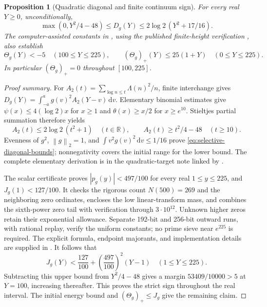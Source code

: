 \documentclass[11pt]{article}
\numberwithin{equation}{section}
\newtheorem{proposition}[theorem]{Proposition}
\theoremstyle{definition}
\theoremstyle{remark}
\newcommand{\norm}[1]{\left\lVert #1\right\rVert}
\newcommand{\dd}{\,\mathrm d}
\begin{document}
\begin{proposition}[Quadratic diagonal and finite continuum sign]
\label{prop:selective-finite-sign}
For every real \(Y\ge0\), unconditionally,
\begin{equation}\label{eq:selective-diagonal-bounds}
\max(0,Y^2/4-48)\le D_g(Y)
\le2\log2\,(Y^2+17/16).
\end{equation}
The computer-assisted constants in \cite{SelectiveLossCertificate},
using the published finite-height verification \cite{PlattTrudgian},
also establish
\begin{equation}\label{eq:selective-finite-sign}
\Theta_g(Y)<-5\quad(100\le Y\le225),\qquad
(\Theta_g)_+(Y)\le25(1+Y)\quad(0\le Y\le225).
\end{equation}
In particular \((\Theta_g)_+=0\) throughout \([100,225]\).
\end{proposition}
\begin{proof}[Proof summary]
For \(A_2(t)=\sum_{\log n\le t}\Lambda(n)^2/n\), finite
interchange gives \(D_g(Y)=\int_{-a}^ag(v)^2A_2(Y-v)\dd v\).
Elementary binomial estimates give \(\psi(x)\le4(\log2)x\)
for \(x\ge1\) and \(\theta(x)\ge x/2\) for \(x\ge e^{10}\).
Stieltjes partial summation therefore yields
\[
A_2(t)\le2\log2\,(t^2+1)\quad(t\in\mathbb R),\qquad
A_2(t)\ge t^2/4-48\quad(t\ge10).
\]
Evenness of \(g^2\), \(\norm g_2=1\), and
\(\int v^2g(v)^2\dd v\le1/16\) prove
\eqref{eq:selective-diagonal-bounds}; nonnegativity covers the initial
range for the lower bound. The complete elementary derivation is in
the quadratic-target note linked by \cite{SelectiveLossNotes}.

The scalar certificate proves \(|p_g(y)|<497/100\) for every real
\(1\le y\le225\), and \(J_g(1)<127/100\).
It checks the rigorous count \(N(500)=269\) and the neighboring
zero ordinates, encloses the low linear-transform mass, and combines
the sixth-power zero tail with verification through
\(3\cdot10^{12}\). Unknown higher zeros retain their exponential
allowance. Separate 192-bit and 256-bit outward runs, with rational
replay, verify the uniform constants; no prime sieve near \(e^{225}\)
is required. The explicit formula, endpoint majorants, and implementation
details are supplied in \cite{SelectiveLossNotes,SelectiveLossCertificate}.
It follows that
\[
J_g(Y)<\frac{127}{100}+\left(\frac{497}{100}\right)^2(Y-1)
\quad(1\le Y\le225).
\]
Subtracting this upper bound from \(Y^2/4-48\) gives a margin
\(53409/10000>5\) at \(Y=100\), increasing thereafter.
This proves the strict sign throughout the real interval. The initial
energy bound and \((\Theta_g)_+\le J_g\) give the remaining claim.
\end{proof}
\end{document}
